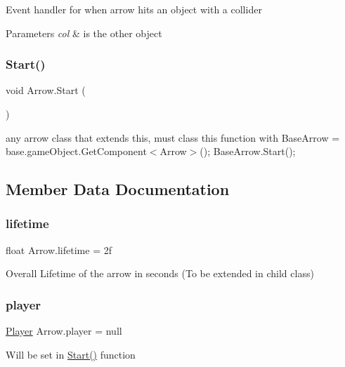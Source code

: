 Event handler for when arrow hits an object with a collider 
\begin{DoxyParams}{Parameters}
{\em col} & is the other object \\
\hline
\end{DoxyParams}
\mbox{\label{class_arrow_a65ce0e1a14405dec237e13ee5631b07d}} 
\subsubsection{\texorpdfstring{Start()}{Start()}}
{\footnotesize\ttfamily void Arrow.\+Start (\begin{DoxyParamCaption}{ }\end{DoxyParamCaption})}

any arrow class that extends this, must class this function with Base\+Arrow = base.\+game\+Object.\+Get\+Component$<$\+Arrow$>$(); Base\+Arrow.\+Start(); 

\subsection{Member Data Documentation}
\mbox{\label{class_arrow_a1ee7f10c0328ab7f8dccc8fcd061494b}} 
\subsubsection{\texorpdfstring{lifetime}{lifetime}}
{\footnotesize\ttfamily float Arrow.\+lifetime = 2f}

Overall Lifetime of the arrow in seconds (To be extended in child class) \mbox{\label{class_arrow_ac895e2c34f4eebe49198b1139b966541}} 
\subsubsection{\texorpdfstring{player}{player}}
{\footnotesize\ttfamily \hyperlink{class_player}{Player} Arrow.\+player = null}

Will be set in \hyperlink{class_arrow_a65ce0e1a14405dec237e13ee5631b07d}{Start()} function \mbox{\label{class_arrow_aae6ab7eee0fa3a72f17c4c46ce391e8a}} 
